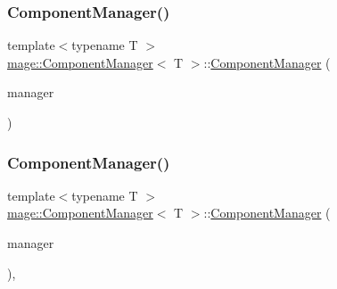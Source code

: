 \subsubsection{\texorpdfstring{Component\+Manager()}{ComponentManager()}\hspace{0.1cm}{\footnotesize\ttfamily [2/3]}}
{\footnotesize\ttfamily template$<$typename T $>$ \\
\mbox{\hyperlink{classmage_1_1_component_manager}{mage\+::\+Component\+Manager}}$<$ T $>$\+::\mbox{\hyperlink{classmage_1_1_component_manager}{Component\+Manager}} (\begin{DoxyParamCaption}\item[{const \mbox{\hyperlink{classmage_1_1_component_manager}{Component\+Manager}}$<$ T $>$ \&}]{manager }\end{DoxyParamCaption})\hspace{0.3cm}{\ttfamily [default]}}

\mbox{\label{classmage_1_1_component_manager_a7412dca61f242beedc37edcbe63b738f}} 
\subsubsection{\texorpdfstring{Component\+Manager()}{ComponentManager()}\hspace{0.1cm}{\footnotesize\ttfamily [3/3]}}
{\footnotesize\ttfamily template$<$typename T $>$ \\
\mbox{\hyperlink{classmage_1_1_component_manager}{mage\+::\+Component\+Manager}}$<$ T $>$\+::\mbox{\hyperlink{classmage_1_1_component_manager}{Component\+Manager}} (\begin{DoxyParamCaption}\item[{\mbox{\hyperlink{classmage_1_1_component_manager}{Component\+Manager}}$<$ T $>$ \&\&}]{manager }\end{DoxyParamCaption})\hspace{0.3cm}{\ttfamily [default]}, {\ttfamily [noexcept]}}

\mbox{\label{classmage_1_1_component_manager_a3e8eeb1cff08baee60c3cec2238a490f}} 
